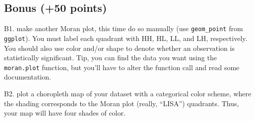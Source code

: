 \documentclass[]{article}
\begin{document}
\hypertarget{bonus-50-points}{%
\subsection{Bonus (+50 points)}\label{bonus-50-points}}

B1. make another Moran plot, this time do so manually (use
\texttt{geom\_point} from \texttt{ggplot}). You must label each quadrant
with HH, HL, LL, and LH, respectively. You should also use color and/or
shape to denote whether an observation is statistically significant.
Tip, you can find the data you want using the \texttt{moran.plot}
function, but you'll have to alter the function call and read some
documentation.

B2. plot a choropleth map of your dataset with a categorical color
scheme, where the shading corresponds to the Moran plot (really,
``LISA'') quadrants. Thus, your map will have four shades of color.
\end{document}

